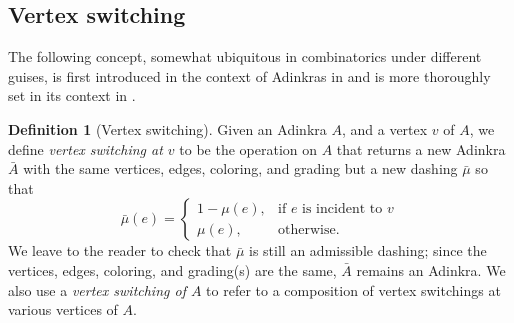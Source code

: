 \documentclass[12pt,twoside,singlespace]{article}
\numberwithin{equation}{section}
\theoremstyle{definition}
\newtheorem{definition}[equation]{Definition}
\begin{document}
\subsection{Vertex switching}
\label{sec:vertexswitch}

The following concept, somewhat ubiquitous in combinatorics under different guises, is first introduced in the context of Adinkras in \cite{d2l:first} and is more thoroughly set in its context in \cite{dil:cohomology,zhang:adinkras}.

\begin{definition}[Vertex switching]
Given an Adinkra $A$, and a vertex $v$ of $A$, we define \emph{vertex switching at $v$} to be the operation on $A$ that returns a new Adinkra $\bar{A}$ with the same vertices, edges, coloring, and grading but a new dashing $\bar{\mu}$ so that
\begin{equation}
\bar{\mu}(e)=\begin{cases}
1-\mu(e),&\mbox{if $e$ is incident to $v$}\\
\mu(e),&\mbox{otherwise.}
\end{cases}
\end{equation}
We leave to the reader to check that $\bar{\mu}$ is still an admissible dashing; since the vertices, edges, coloring, and grading(s) are the same, $\bar{A}$ remains an Adinkra. We also use a \emph{vertex switching of $A$} to refer to a composition of vertex switchings at various vertices of $A$. 
\end{definition}
\end{document}
